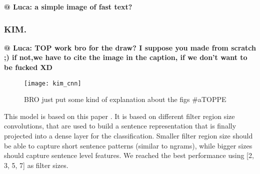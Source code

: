 \textbf{@ Luca: a simple image of fast text?}


\subsubsection{KIM.}

\textbf{@ Luca: TOP work bro for the draw? I suppose you made from scratch ;) if not,we have to cite the image in the caption, if we don't want to be fucked XD}


\begin{figure}[h]
\centering
\texttt{[image: kim\_cnn]}
\caption{BRO just put some kind of explanation about the figs \#aTOPPE}
\label{fig:ants_example}
\end{figure}


This model is based on this paper \cite{kim2014convolutional}. It is based on different filter region size convolutions, that are used to build a sentence representation that is finally projected into a dense layer for the classification.
Smaller filter region size should be able to capture short sentence patterns (similar to ngrams), while bigger sizes should capture sentence level features. We reached the best performance using [2, 3, 5, 7] as filter sizes.
